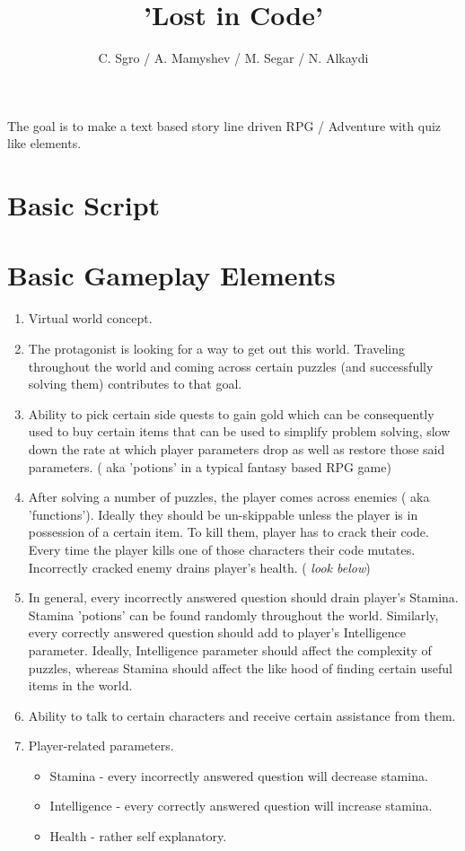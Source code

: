 \documentclass[12pt]{article}
\begin{document}
\title{'Lost in Code' }
\author{C. Sgro / A. Mamyshev / M. Segar / N. Alkaydi}
\maketitle

\paragraph*{}
The goal is to make a text based story line driven RPG / Adventure with quiz like elements. 

\section{Basic Script}


\section{Basic Gameplay Elements}
\begin{enumerate}
\item Virtual world concept.
\item The protagonist is looking for a way to get out this world. Traveling throughout the world and coming across certain puzzles (and successfully solving them) contributes to that goal. 
\item Ability to pick certain side quests to gain gold which can be consequently used to buy  certain items that can be used to simplify problem solving, slow down the rate at which player parameters drop as well as restore those said parameters. ( aka 'potions' in a typical fantasy based RPG game)
\item After solving a number of puzzles, the player comes across enemies ( aka 'functions'). Ideally they should be un-skippable unless the player is in possession of a certain item. To kill them, player has to crack their code. Every time the player kills one of those characters their code mutates. Incorrectly cracked enemy drains player's health. (\textit{ look below})
\item In general, every incorrectly answered question should drain player's Stamina. Stamina 'potions' can be found randomly throughout the world. Similarly, every correctly answered question should add to player's Intelligence parameter.  Ideally,  Intelligence  parameter should affect the complexity of puzzles, whereas Stamina should affect the like hood of finding certain useful items in the world.
\item Ability to talk to certain characters and receive certain assistance from them. 
\item Player-related parameters. 
\begin{itemize}
\item Stamina - every incorrectly answered question will decrease stamina.
\item Intelligence - every correctly answered question will increase stamina.
\item Health - rather self explanatory. 
\end{itemize}


\end{enumerate}  

    
\end{document}
